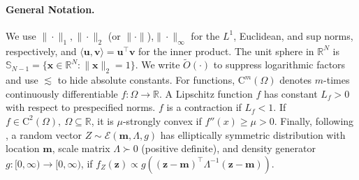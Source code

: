 \documentclass{article} %
\begin{document}
\paragraph{General Notation.} We use $\|\cdot\|_1,\|\cdot\|_2$ (or $\| \cdot \|$),$\|\cdot\|_\infty$ for the $L^1$, Euclidean, and sup norms, respectively, and 
$\langle \mathbf{u},\mathbf{v}\rangle=\mathbf{u}^\top\mathbf{v}$ for the inner product. The unit sphere in $\mathbb{R}^N$ is $\mathbb{S}_{N-1}=\{\mathbf{x}\in\mathbb{R}^N:\|\mathbf{x}\|_2=1\}$. We write $\tilde O(\cdot)$ to suppress logarithmic factors and use $\lesssim$ to hide absolute constants. For functions, $\mathrm{C}^m(\Omega)$ denotes $m$-times continuously differentiable $f:\Omega\to\mathbb{R}$. 
A Lipschitz function $f$ has constant $L_f>0$ with respect to prespecified norms. $f$ is a contraction if $L_f<1$. If $f\in \mathrm{C}^2(\Omega),\ \Omega\subseteq\mathbb{R}$, it is $\mu$-strongly convex if $f''(x)\geq\mu>0$. Finally, following \citet[Pag.~86]{delmas2024elliptically}, a random vector 
$Z\sim \mathscr{E}(\mathbf{m},\Lambda,g)$ has elliptically symmetric distribution with location $\mathbf{m}$, 
scale matrix $\Lambda\succ 0$ (positive definite), and density generator $g:[0,\infty)\to[0,\infty)$, if $f_Z(\mathbf{z}) \propto g\left((\mathbf{z}-\mathbf{m})^\top \Lambda^{-1}(\mathbf{z}-\mathbf{m})\right)$.
\end{document}
